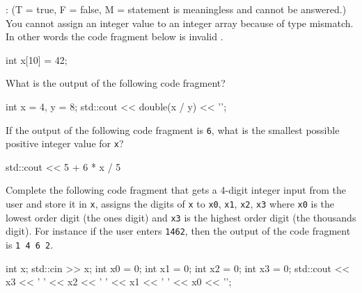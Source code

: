 \nextq
\tf:
(T = true, F = false, M = statement is meaningless and cannot be answered.)
You cannot assign an integer value to an integer array because
of type mismatch.
In other words the code fragment below is invalid \cpp.
\begin{console}[fontsize=\footnotesize]
int x[10] = 42;
\end{console}
\ANSWER
\begin{answercode}

\end{answercode}

\nextq
What is the output of the following code fragment?
\begin{console}[fontsize=\footnotesize]
int x = 4, y = 8;
std::cout << double(x / y) << '\n';
\end{console}
\ANSWER
\begin{answercode}

\end{answercode}

\nextq
If the output of the following code fragment is \verb!6!,
what is the smallest possible positive integer value for \verb!x!?
\begin{console}[fontsize=\footnotesize]
std::cout << 5 + 6 * x / 5 %
\end{console}
\ANSWER
\begin{answercode}

\end{answercode}

\nextq
Complete the following code fragment that gets a 4-digit integer input from the
user and store it in \verb!x!,
assigns the digits of \verb!x! to
\verb!x0!, \verb!x1!, \verb!x2!, \verb!x3!
where \verb!x0! is the lowest order digit (the ones digit)
and \verb!x3! is the highest order digit (the thousands digit).
For instance if the user enters \verb!1462!, then the output of the
code fragment is \verb!1 4 6 2!.
\\
\ANSWER
\begin{answercode}
int x;
std::cin >> x;
int x0 = 0;
int x1 = 0;
int x2 = 0;
int x3 = 0;
std::cout << x3 << ' ' << x2 << ' ' << x1 << ' ' << x0 << '\n';
\end{answercode}


